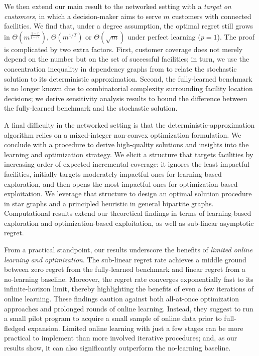 \documentclass[nonblindrev]{informs3noheader}
\begin{document}
We then extend our main result to the networked setting with a \textit{target on customers}, in which a decision-maker aims to serve $m$ customers with connected facilities. We find that, under a degree assumption, the optimal regret still grows in $\Theta\left(m^{\frac{1-r}{1-r^T}}\right)$, $\Theta(m^{1/T})$ or $\Theta(\sqrt m)$ under perfect learning ($p=1$). The proof is complicated by two extra factors. First, customer coverage does not merely depend on the number but on the set of successful facilities; in turn, we use the concentration inequality in dependency graphs from \cite{janisch2024berry} to relate the stochastic solution to its deterministic approximation. Second, the fully-learned benchmark is no longer known due to combinatorial complexity surrounding facility location decisions; we derive sensitivity analysis results to bound the difference between the fully-learned benchmark and the stochastic solution.

A final difficulty in the networked setting is that the deterministic-approximation algorithm relies on a mixed-integer non-convex optimization formulation. We conclude with a procedure to derive high-quality solutions and insights into the learning and optimization strategy. We elicit a structure that targets facilities by increasing order of expected incremental coverage: it ignores the least impactful facilities, initially targets moderately impactful ones for learning-based exploration, and then opens the most impactful ones for optimization-based exploitation. We leverage that structure to design an optimal solution procedure in star graphs and a principled heuristic in general bipartite graphs. Computational results extend our theoretical findings in terms of learning-based exploration and optimization-based exploitation, as well as sub-linear asymptotic regret.

From a practical standpoint, our results underscore the benefits of \textit{limited online learning and optimization}. The sub-linear regret rate achieves a middle ground between zero regret from the fully-learned benchmark and linear regret from a no-learning baseline. Moreover, the regret rate converges exponentially fast to its infinite-horizon limit, thereby highlighting the benefits of even a few iterations of online learning. These findings caution against both all-at-once optimization approaches and prolonged rounds of online learning. Instead, they suggest to run a small pilot program to acquire a small sample of online data prior to full-fledged expansion. Limited online learning with just a few stages can be more practical to implement than more involved iterative procedures; and, as our results show, it can also significantly outperform the no-learning baseline.
\end{document}
